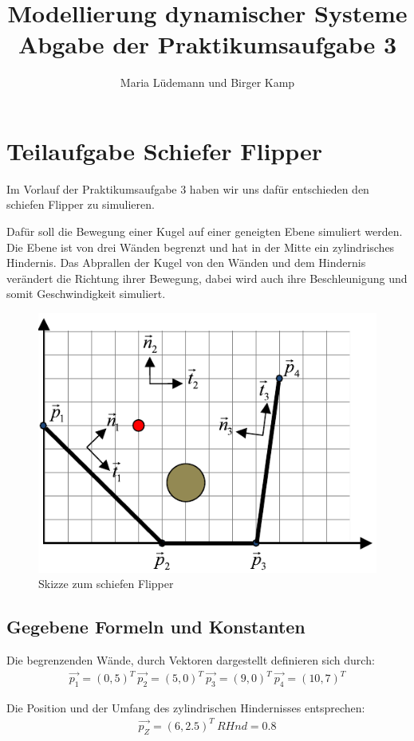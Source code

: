 \documentclass[]{scrartcl}
\title{Modellierung dynamischer Systeme  \\ Abgabe der Praktikumsaufgabe 3}
\author{Maria Lüdemann und Birger Kamp}
\begin{document}
\maketitle
{}
\tableofcontents
\newpage


\section{Teilaufgabe Schiefer Flipper}
Im Vorlauf der Praktikumsaufgabe 3 haben wir uns dafür entschieden den schiefen Flipper zu simulieren.

Dafür soll die Bewegung einer Kugel auf einer geneigten Ebene simuliert werden. Die Ebene ist von drei Wänden begrenzt und hat in der Mitte ein zylindrisches Hindernis. Das Abprallen der Kugel von den Wänden und dem Hindernis verändert die Richtung ihrer Bewegung, dabei wird auch ihre Beschleunigung und somit Geschwindigkeit simuliert.

\begin{figure}[H]
	\centering
	\includegraphics[width=0.8\linewidth]{./skizze_schieferFlipper}
	\caption{Skizze zum schiefen Flipper}
	\label{fig:1_skizze_schieferFlipper}
\end{figure}

\subsection{Gegebene Formeln und Konstanten}
Die begrenzenden Wände, durch Vektoren dargestellt definieren sich durch:
\begin{align}
\vec{p_1} = (0,5)^T \ 
\vec{p_2} = (5,0)^T \ 
\vec{p_3} = (9,0)^T \ 
\vec{p_4} = (10,7)^T
\end{align}

Die Position und der Umfang des zylindrischen Hindernisses entsprechen:
\begin{align}
\vec{p_Z} = (6,2.5)^T \ 
RHnd = 0.8
\end{align}
\end{document}
